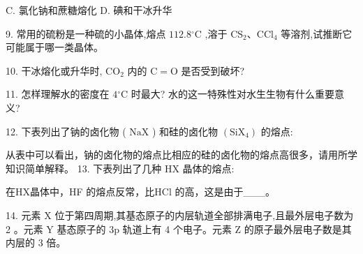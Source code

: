 \documentclass[10pt]{article}
\begin{document}
C. 氯化钠和蔗糖熔化 D. 碘和干冰升华

9. 常用的硫粉是一种硫的小晶体,熔点 \({112.8}{}^{ \circ }\mathrm{C}\) ,溶于 \({\mathrm{{CS}}}_{2}\text{、}{\mathrm{{CCl}}}_{4}\) 等溶剂,试推断它可能属于哪一类晶体。

10. 干冰熔化或升华时, \({\mathrm{{CO}}}_{2}\) 内的 \(\mathrm{C} = \mathrm{O}\) 是否受到破坏?

11. 怎样理解水的密度在 \(4{}^{ \circ }\mathrm{C}\) 时最大? 水的这一特殊性对水生生物有什么重要意义?

12. 下表列出了钠的卤化物 ( \(\mathrm{{NaX}}\) ) 和硅的卤化物 \(\left( {\mathrm{{SiX}}}_{4}\right)\) 的熔点:

\begin{center}
\end{center}

从表中可以看出，钠的卤化物的熔点比相应的硅的卤化物的熔点高很多，请用所学知识简单解释。 13. 下表列出了几种 \(\mathrm{{HX}}\) 晶体的熔点:

\begin{center}
\end{center}

在HX晶体中，HF 的熔点反常，比HCl 的高，这是由于\_\_\_。

14. 元素 \(\mathrm{X}\) 位于第四周期,其基态原子的内层轨道全部排满电子,且最外层电子数为 2 。元素 \(\mathrm{Y}\) 基态原子的 \(3\mathrm{p}\) 轨道上有 4 个电子。元素 \(\mathrm{Z}\) 的原子最外层电子数是其内层的 3 倍。
\end{document}
